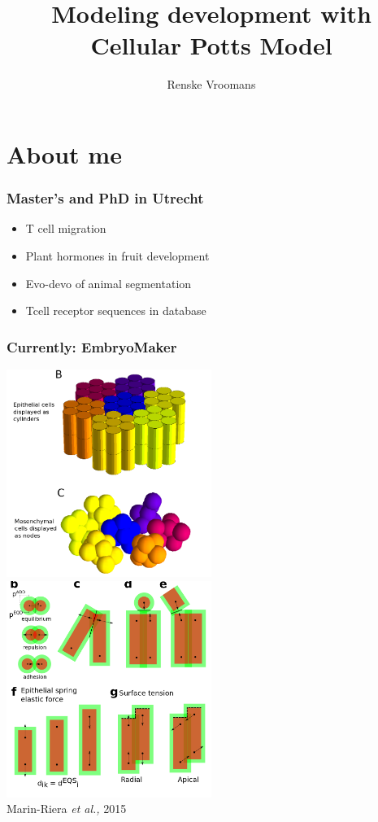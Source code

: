 \documentclass[compress]{beamer}
\title[CPM]{\large \textbf{Modeling development with Cellular Potts Model}} %
\date{}
\author{Renske Vroomans}
\makeatletter
\let\beamer@writeslidentry@miniframeson=\beamer@writeslidentry
\def\beamer@writeslidentry@miniframesoff{%
  \expandafter\beamer@ifempty\expandafter{\beamer@framestartpage}{}%
  {%
    \clearpage\beamer@notesactions%
  }
}
\newcommand*{\miniframeson}{\let\beamer@writeslidentry=\beamer@writeslidentry@miniframeson}
\newcommand*{\miniframesoff}{\let\beamer@writeslidentry=\beamer@writeslidentry@miniframesoff}
\makeatother
\begin{document}
 
 
\miniframesoff
 
\begin{frame}[plain]
\titlepage
\end{frame}
\miniframeson

\section{About me}

\begin{frame}
\frametitle{Master's and PhD in Utrecht}

\begin{itemize}
 \item T cell migration
 \item Plant hormones in fruit development
 \item Evo-devo of animal segmentation
 \item Tcell receptor sequences in database
\end{itemize}

\end{frame}


\begin{frame}
\frametitle{Currently: EmbryoMaker}
 \begin{center}
     \includegraphics[width=0.5\textwidth]{figures/embryomaker_init.png}
     \includegraphics[width=0.5\textwidth]{figures/embryomaker_exp.png}\\
     \tiny Marin-Riera \textit{et al.,} 2015
     \end{center}
\end{frame}
\end{document}
